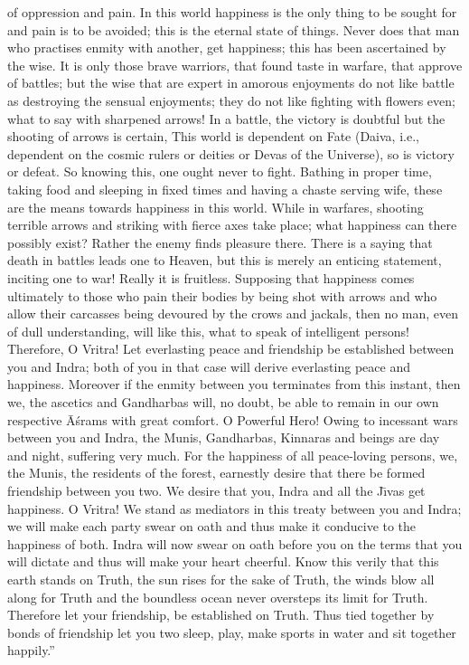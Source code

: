 of oppression and pain. In this world happiness is the only thing to be sought for and pain is to be avoided; this is the eternal state of things. Never does that man who practises enmity with another, get happiness; this has been ascertained by the wise. It is only those brave warriors, that found taste in warfare, that approve of battles; but the wise that are expert in amorous enjoyments do not like battle as destroying the sensual enjoyments; they do not like fighting with flowers even; what to say with sharpened arrows! In a battle, the victory is doubtful but the shooting of arrows is certain, This world is dependent on Fate (Daiva, i.e., dependent on the cosmic rulers or deities or Devas of the Universe), so is victory or defeat. So knowing this, one ought never to fight. Bathing in proper time, taking food and sleeping in fixed times and having a chaste serving wife, these are the means towards happiness in this world. While in warfares, shooting terrible arrows and striking with fierce axes take place; what happiness can there possibly exist? Rather the enemy finds pleasure there. There is a saying that death in battles leads one to Heaven, but this is merely an enticing statement, inciting one to war! Really it is fruitless. Supposing that happiness comes ultimately to those who pain their bodies by being shot with arrows and who allow their carcasses being devoured by the crows and jackals, then no man, even of dull understanding, will like this, what to speak of intelligent persons! Therefore, O Vritra! Let everlasting peace and friendship be established between you and Indra; both of you in that case will derive everlasting peace and happiness. Moreover if the enmity between you terminates from this instant, then we, the ascetics and Gandharbas will, no doubt, be able to remain in our own respective \=A\'srams with great comfort. O Powerful Hero! Owing to incessant wars between you and Indra, the Munis, Gandharbas, Kinnaras and beings are day and night, suffering very much. For the happiness of all peace-loving persons, we, the Munis, the residents of the forest, earnestly desire that there be formed friendship between you two. We desire that you, Indra and all the J\={\i}vas get happiness. O Vritra! We stand as mediators in this treaty between you and Indra; we will make each party swear on oath and thus make it conducive to the happiness of both. Indra will now swear on oath before you on the terms that you will dictate and thus will make your heart cheerful. Know this verily that this earth stands on Truth, the sun rises for the sake of Truth, the winds blow all along for Truth and the boundless ocean never oversteps its limit for Truth. Therefore let your friendship, be established on Truth. Thus tied together by bonds of friendship let you two sleep, play, make sports in water and sit together happily.''

